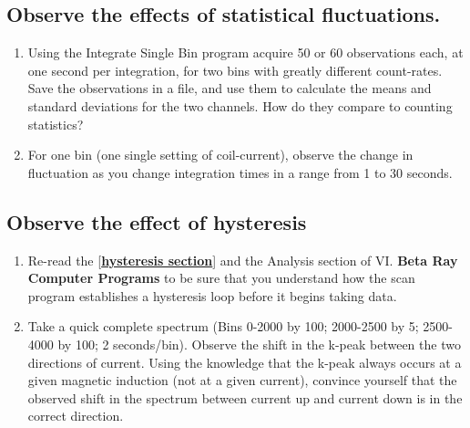 \documentclass{../lab}
\begin{document}
\subsection{Observe the effects of statistical fluctuations.}

\begin{enumerate}
    \item Using the Integrate Single Bin program acquire 50 or 60 observations each, at one second per integration, for two bins with greatly different count-rates. Save the observations in a file, and use them to calculate the means and standard deviations for the two channels. How do they compare to counting statistics?

    \item For one bin (one single setting of coil-current), observe the change in fluctuation as you change integration times in a range from 1 to 30 seconds.
    

\end{enumerate}

\subsection{Observe the effect of hysteresis}

\begin{enumerate}
    \item Re-read the [\href{http://experimentationlab.berkeley.edu/Hysteresis}{\textbf{hysteresis section}}] and the Analysis section of VI. \textbf{Beta Ray Computer Programs} to be sure that you understand how the scan program establishes a hysteresis loop before it begins taking data.

    \item Take a quick complete spectrum (Bins 0-2000 by 100; 2000-2500 by 5; 2500-4000 by 100; 2 seconds/bin). Observe the shift in the k-peak between the two directions of current. Using the knowledge that the k-peak always occurs at a given magnetic induction (not at a given current), convince yourself that the observed shift in the spectrum between current up and current down is in the correct direction.
    

\end{enumerate}
\end{document}
